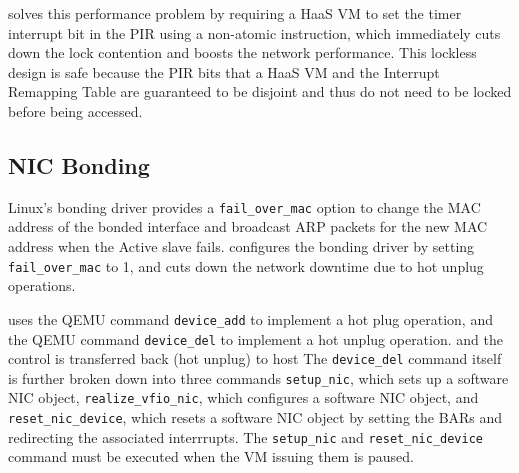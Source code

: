 \na solves this performance problem by requiring a HaaS VM to set the timer interrupt bit
in the PIR using a non-atomic instruction, which immediately cuts down the lock contention
and boosts the network performance. This lockless design is safe because the PIR bits that a HaaS VM and the Interrupt Remapping Table are guaranteed to be disjoint and thus do not need to be locked before being accessed.


\subsection{NIC Bonding}
Linux's bonding driver provides a \texttt{fail\_over\_mac} option to change 
the MAC address of the bonded interface and broadcast ARP packets for the new MAC address when the Active slave fails. \na configures the bonding driver by setting   
\texttt{fail\_over\_mac} to 1, and cuts down the
network downtime due to hot unplug operations.


\na uses the QEMU command \texttt{device\_add} to implement a hot plug operation,
and the QEMU command \texttt{device\_del} to implement a hot unplug operation. 
and the control is transferred back (hot unplug) to host 
The \texttt{device\_del} command itself is further broken down 
into three commands \texttt{setup\_nic}, which sets up a software NIC object, 
\texttt{realize\_vfio\_nic}, which configures a software NIC object, and \texttt{reset\_nic\_device}, which resets a software NIC object by setting the 
BARs and redirecting the associated interrrupts. 
The \texttt{setup\_nic} and \texttt{reset\_nic\_device} command must be executed when the VM issuing them is paused. 
